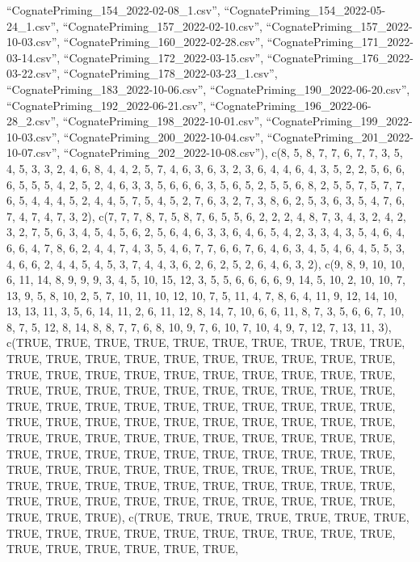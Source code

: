 \documentclass[
  letterpaper,
  DIV=11,
  numbers=noendperiod]{scrartcl}
\begin{document}
``CognatePriming\_154\_2022-02-08\_1.csv'',
``CognatePriming\_154\_2022-05-24\_1.csv'',
``CognatePriming\_157\_2022-02-10.csv'',
``CognatePriming\_157\_2022-10-03.csv'',
``CognatePriming\_160\_2022-02-28.csv'',
``CognatePriming\_171\_2022-03-14.csv'',
``CognatePriming\_172\_2022-03-15.csv'',
``CognatePriming\_176\_2022-03-22.csv'',
``CognatePriming\_178\_2022-03-23\_1.csv'',
``CognatePriming\_183\_2022-10-06.csv'',
``CognatePriming\_190\_2022-06-20.csv'',
``CognatePriming\_192\_2022-06-21.csv'',
``CognatePriming\_196\_2022-06-28\_2.csv'',
``CognatePriming\_198\_2022-10-01.csv'',
``CognatePriming\_199\_2022-10-03.csv'',
``CognatePriming\_200\_2022-10-04.csv'',
``CognatePriming\_201\_2022-10-07.csv'',
``CognatePriming\_202\_2022-10-08.csv''), c(8, 5, 8, 7, 7, 6, 7, 7, 3,
5, 4, 5, 3, 3, 2, 4, 6, 8, 4, 4, 2, 5, 7, 4, 6, 3, 6, 3, 2, 3, 6, 4, 4,
6, 4, 3, 5, 2, 2, 5, 6, 6, 6, 5, 5, 5, 4, 2, 5, 2, 4, 6, 3, 3, 5, 6, 6,
6, 3, 5, 6, 5, 2, 5, 5, 6, 8, 2, 5, 5, 7, 5, 7, 7, 6, 5, 4, 4, 4, 5, 2,
4, 4, 5, 7, 5, 4, 5, 2, 7, 6, 3, 2, 7, 3, 8, 6, 2, 5, 3, 6, 3, 5, 4, 7,
6, 7, 4, 7, 4, 7, 3, 2), c(7, 7, 7, 8, 7, 5, 8, 7, 6, 5, 5, 6, 2, 2, 2,
4, 8, 7, 3, 4, 3, 2, 4, 2, 3, 2, 7, 5, 6, 3, 4, 5, 4, 5, 6, 2, 5, 6, 4,
6, 3, 3, 6, 4, 6, 5, 4, 2, 3, 3, 4, 3, 5, 4, 6, 4, 6, 6, 4, 7, 8, 6, 2,
4, 4, 7, 4, 3, 5, 4, 6, 7, 7, 6, 6, 7, 6, 4, 6, 3, 4, 5, 4, 6, 4, 5, 5,
3, 4, 6, 6, 2, 4, 4, 5, 4, 5, 3, 7, 4, 4, 3, 6, 2, 6, 2, 5, 2, 6, 4, 6,
3, 2), c(9, 8, 9, 10, 10, 6, 11, 14, 8, 9, 9, 9, 3, 4, 5, 10, 15, 12, 3,
5, 5, 6, 6, 6, 6, 9, 14, 5, 10, 2, 10, 10, 7, 13, 9, 5, 8, 10, 2, 5, 7,
10, 11, 10, 12, 10, 7, 5, 11, 4, 7, 8, 6, 4, 11, 9, 12, 14, 10, 13, 13,
11, 3, 5, 6, 14, 11, 2, 6, 11, 12, 8, 14, 7, 10, 6, 6, 11, 8, 7, 3, 5,
6, 6, 7, 10, 8, 7, 5, 12, 8, 14, 8, 8, 7, 7, 6, 8, 10, 9, 7, 6, 10, 7,
10, 4, 9, 7, 12, 7, 13, 11, 3), c(TRUE, TRUE, TRUE, TRUE, TRUE, TRUE,
TRUE, TRUE, TRUE, TRUE, TRUE, TRUE, TRUE, TRUE, TRUE, TRUE, TRUE, TRUE,
TRUE, TRUE, TRUE, TRUE, TRUE, TRUE, TRUE, TRUE, TRUE, TRUE, TRUE, TRUE,
TRUE, TRUE, TRUE, TRUE, TRUE, TRUE, TRUE, TRUE, TRUE, TRUE, TRUE, TRUE,
TRUE, TRUE, TRUE, TRUE, TRUE, TRUE, TRUE, TRUE, TRUE, TRUE, TRUE, TRUE,
TRUE, TRUE, TRUE, TRUE, TRUE, TRUE, TRUE, TRUE, TRUE, TRUE, TRUE, TRUE,
TRUE, TRUE, TRUE, TRUE, TRUE, TRUE, TRUE, TRUE, TRUE, TRUE, TRUE, TRUE,
TRUE, TRUE, TRUE, TRUE, TRUE, TRUE, TRUE, TRUE, TRUE, TRUE, TRUE, TRUE,
TRUE, TRUE, TRUE, TRUE, TRUE, TRUE, TRUE, TRUE, TRUE, TRUE, TRUE, TRUE,
TRUE, TRUE, TRUE, TRUE, TRUE, TRUE, TRUE, TRUE, TRUE, TRUE, TRUE),
c(TRUE, TRUE, TRUE, TRUE, TRUE, TRUE, TRUE, TRUE, TRUE, TRUE, TRUE,
TRUE, TRUE, TRUE, TRUE, TRUE, TRUE, TRUE, TRUE, TRUE, TRUE, TRUE, TRUE,
\end{document}
